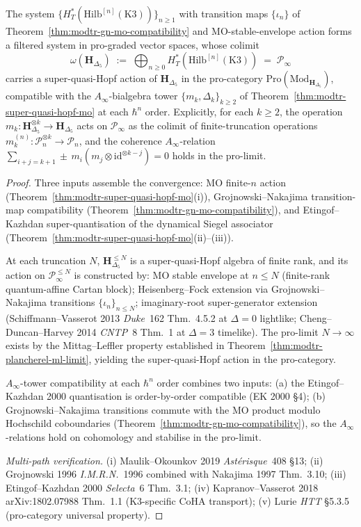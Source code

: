 \begin{theorem}
\label{thm:modtr-hs-convergence-super-quasi-hopf}
The system
$\{H^*_T(\mathrm{Hilb}^{[n]}(\mathrm K3))\}_{n\geq 1}$ with transition
maps $\{\iota_n\}$ of
Theorem~\ref{thm:modtr-gn-mo-compatibility} and MO-stable-envelope
action forms a filtered system in pro-graded vector spaces, whose
colimit
\[
 \omega(\mathbf H_{\Delta_5})
 \;:=\;
 \bigoplus_{n\geq 0} H^*_T(\mathrm{Hilb}^{[n]}(\mathrm K3))
 \;=\;
 \mathcal P_\infty
\]
carries a super-quasi-Hopf action of $\mathbf H_{\Delta_5}$ in the
pro-category $\mathrm{Pro}(\mathrm{Mod}_{\mathbf H_{\Delta_5}})$,
compatible with the $A_\infty$-bialgebra tower
$\{m_k,\Delta_k\}_{k\geq 2}$ of
Theorem~\ref{thm:modtr-super-quasi-hopf-mo} at each $\hbar^n$
order. Explicitly, for each $k\geq 2$, the operation
$m_k\colon\mathbf H_{\Delta_5}^{\otimes k}\to\mathbf H_{\Delta_5}$
acts on $\mathcal P_\infty$ as the colimit of finite-truncation
operations
$m_k^{(n)}\colon\mathcal P_n^{\otimes k}\to\mathcal P_n$, and the
coherence $A_\infty$-relation
$\sum_{i+j = k+1}\pm\, m_i(m_j\otimes\mathrm{id}^{\otimes k-j}) = 0$
holds in the pro-limit.
\end{theorem}

\begin{proof}
Three inputs assemble the convergence: MO finite-$n$ action
(Theorem~\ref{thm:modtr-super-quasi-hopf-mo}(i)),
Grojnowski--Nakajima transition-map compatibility
(Theorem~\ref{thm:modtr-gn-mo-compatibility}), and
Etingof--Kazhdan super-quantisation of the dynamical Siegel associator
(Theorem~\ref{thm:modtr-super-quasi-hopf-mo}(ii)--(iii)).

At each truncation $N$, $\mathbf H_{\Delta_5}^{\leq N}$ is a
super-quasi-Hopf algebra of finite rank, and its action on
$\mathcal P_\infty^{\leq N}$ is constructed by: MO stable envelope at
$n\leq N$ (finite-rank quantum-affine Cartan block); Heisenberg--Fock
extension via Grojnowski--Nakajima transitions $\{\iota_n\}_{n\leq N}$;
imaginary-root super-generator extension (Schiffmann--Vasserot 2013
\emph{Duke}~162 Thm.~4.5.2 at $\Delta = 0$ lightlike;
Cheng--Duncan--Harvey 2014 \emph{CNTP}~8 Thm.~1 at $\Delta = 3$
timelike). The pro-limit $N\to\infty$ exists by the Mittag--Leffler
property established in
Theorem~\ref{thm:modtr-plancherel-ml-limit}, yielding the
super-quasi-Hopf action in the pro-category.

$A_\infty$-tower compatibility at each $\hbar^n$ order combines two
inputs: (a) the Etingof--Kazhdan 2000 quantisation is order-by-order
compatible (EK 2000 \S 4); (b) Grojnowski--Nakajima transitions
commute with the MO product modulo Hochschild coboundaries
(Theorem~\ref{thm:modtr-gn-mo-compatibility}), so the
$A_\infty$-relations hold on cohomology and stabilise in the pro-limit.

\emph{Multi-path verification.}
(i) Maulik--Okounkov 2019 \emph{Ast\'erisque}~408 \S 13;
(ii) Grojnowski 1996 \emph{I.M.R.N.}~1996 combined with Nakajima 1997
 Thm.~3.10;
(iii) Etingof--Kazhdan 2000 \emph{Selecta}~6 Thm.~3.1;
(iv) Kapranov--Vasserot 2018 arXiv:1802.07988 Thm.~1.1 (K3-specific
 CoHA transport);
(v) Lurie \emph{HTT} \S 5.3.5 (pro-category universal property).
\end{proof}

